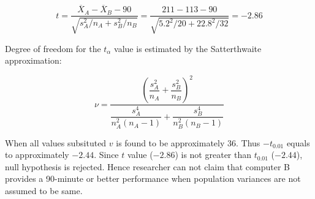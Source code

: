 \documentclass[12pt]{article}
\begin{document}
\begin{equation*}
		t = \frac{ \overline{X}_A - \overline{X}_B - 90}{\sqrt{s_A^2/n_A + s_B^2/n_B}} = \frac{ 211 - 113 - 90}{\sqrt{5.2^2/20 + 22.8^2/32}} = -2.86
\end{equation*}

Degree of freedom for the $t_{\alpha}$ value is estimated by the Satterthwaite approximation:

\begin{equation*}
	\nu = \dfrac{\left (\dfrac{s_A^2}{n_A} + \dfrac{s_B^2}{n_B} \right )^2}{ \dfrac{s_A^4}{n_A^2(n_A-1)} + \dfrac{s_B^4}{n_B^2(n_B-1)} }
\end{equation*}

When all values subsituted $v$ is found to be approximately $36$. Thus $-t_{0.01}$ equals to approximately $-2.44$. Since $t$ value ($-2.86$) is not greater than $t_{0.01}$ ($-2.44$), null hypothesis is rejected. Hence researcher can not claim that computer B provides a 90-minute or better performance when population variances are not assumed to be same.
\end{document}
